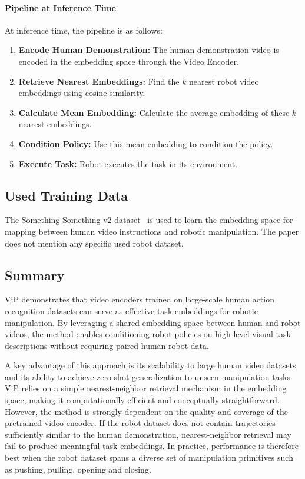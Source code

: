 \paragraph{Pipeline at Inference Time}
At inference time, the pipeline is as follows:
\begin{enumerate}
    \item \textbf{Encode Human Demonstration:} The human demonstration video is encoded in the embedding space through the Video Encoder.
    \item \textbf{Retrieve Nearest Embeddings:} Find the $k$ nearest robot video embeddings using cosine similarity.
    \item \textbf{Calculate Mean Embedding:} Calculate the average embedding of these $k$ nearest embeddings.
    \item \textbf{Condition Policy:} Use this mean embedding to condition the policy.
    \item \textbf{Execute Task:} Robot executes the task in its environment.
\end{enumerate}


\subsection{Used Training Data}
The Something-Something-v2 dataset~\cite{Goyal2017TheS} is used to learn the embedding space for mapping between human video instructions and robotic manipulation.
The paper does not mention any specific used robot dataset.

\subsection{Summary}
ViP demonstrates that video encoders trained on large-scale human action recognition datasets can serve as effective task embeddings for robotic manipulation. By leveraging a shared embedding space between human and robot videos, the method enables conditioning robot policies on high-level visual task descriptions without requiring paired human-robot data.

A key advantage of this approach is its scalability to large human video datasets and its ability to achieve zero-shot generalization to unseen manipulation tasks. ViP relies on a simple nearest-neighbor retrieval mechanism in the embedding space, making it computationally efficient and conceptually straightforward. However, the method is strongly dependent on the quality and coverage of the pretrained video encoder. If the robot dataset does not contain trajectories sufficiently similar to the human demonstration, nearest-neighbor retrieval may fail to produce meaningful task embeddings. In practice, performance is therefore best when the robot dataset spans a diverse set of manipulation primitives such as pushing, pulling, opening and closing.


